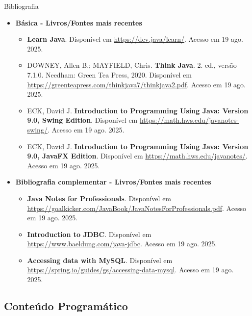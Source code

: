 \documentclass{beamer}
\begin{document}
\begin{frame}{Bibliografia}
    \begin{itemize}
        \item \textbf{Básica - Livros/Fontes mais recentes}
        \begin{itemize}
            \justifying
            \scriptsize
            \item \textbf{Learn Java}. Disponível em \url{https://dev.java/learn/}. Acesso em 19 ago. 2025.
            \item DOWNEY, Allen B.; MAYFIELD, Chris. \textbf{Think Java}. 2. ed., versão 7.1.0. Needham: Green Tea Press, 2020. Disponível em \url{https://greenteapress.com/thinkjava7/thinkjava2.pdf}. Acesso em 19 ago. 2025.
            \item ECK, David J. \textbf{Introduction to Programming Using Java: Version 9.0, Swing Edition}. Disponível em \url{https://math.hws.edu/javanotes-swing/}. Acesso em 19 ago. 2025.
            \item ECK, David J. \textbf{Introduction to Programming Using Java: Version 9.0, JavaFX Edition}. Disponível em \url{https://math.hws.edu/javanotes/}. Acesso em 19 ago. 2025.
        \end{itemize}
        \normalsize
        \item \textbf{Bibliografia complementar - Livros/Fontes mais recentes}
        \begin{itemize}
            \justifying
            \scriptsize
            \item \textbf{Java Notes for Professionals}. Disponível em \url{https://goalkicker.com/JavaBook/JavaNotesForProfessionals.pdf}. Acesso em 19 ago. 2025.
            \item \textbf{Introduction to JDBC}. Disponível em \url{https://www.baeldung.com/java-jdbc}. Acesso em 19 ago. 2025.
            \item \textbf{Accessing data with MySQL}. Disponível em \url{https://spring.io/guides/gs/accessing-data-mysql}. Acesso em 19 ago. 2025.
        \end{itemize}
    \end{itemize}
\end{frame}

\subsection{Conteúdo Programático}
\end{document}
